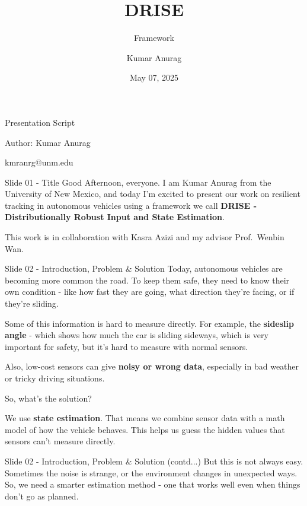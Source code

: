\documentclass{beamer}
\title{DRISE}
\subtitle{Framework}
\author{Kumar Anurag}
\institute{University of New Mexico}
\date{May 07, 2025}
\begin{document}
\begin{frame}
Presentation Script

Author: Kumar Anurag

kmranrg@unm.edu
\end{frame}

\begin{frame}{Slide 01 - Title}
\protect\hypertarget{slide-01---title}{}
Good Afternoon, everyone. I am Kumar Anurag from the University of New
Mexico, and today I'm excited to present our work on resilient tracking
in autonomous vehicles using a framework we call \textbf{DRISE -
Distributionally Robust Input and State Estimation}.

This work is in collaboration with Kasra Azizi and my advisor
Prof.~Wenbin Wan.
\end{frame}

\begin{frame}{Slide 02 - Introduction, Problem \& Solution}
\protect\hypertarget{slide-02---introduction-problem-solution}{}
Today, autonomous vehicles are becoming more common the road. To keep
them safe, they need to know their own condition - like how fast they
are going, what direction they're facing, or if they're sliding.

Some of this information is hard to measure directly. For example, the
\textbf{sideslip angle} - which shows how much the car is sliding
sideways, which is very important for safety, but it's hard to measure
with normal sensors.

Also, low-cost sensors can give \textbf{noisy or wrong data}, especially
in bad weather or tricky driving situations.

So, what's the solution?

We use \textbf{state estimation}. That means we combine sensor data with
a math model of how the vehicle behaves. This helps us guess the hidden
values that sensors can't measure directly.
\end{frame}

\begin{frame}{Slide 02 - Introduction, Problem \& Solution (contd...)}
But this is not always easy. Sometimes the noise is strange, or the
environment changes in unexpected ways. So, we need a smarter estimation
method - one that works well even when things don't go as planned.
\end{frame}
\end{document}
